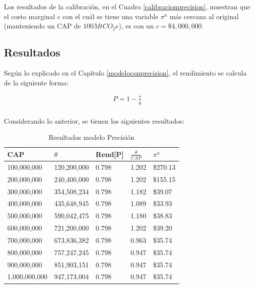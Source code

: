 Los resultados de la calibración, en el Cuadro \ref{calibracionprecision}, muestran que el costo marginal $c$ con el cuál se tiene una variable $\pi^a$ más cercana al original (manteniendo un CAP de $100MtCO_{2}e$), es con un $c=\$4,000,000$.

\subsection{Resultados}

Según lo explicado en el Capítulo \ref{modeloconprecision}, el rendimiento se calcula de la siguiente forma: 
\vspace{2.5mm}

\begin{equation}
\begin{array}{rrclcl}
\displaystyle P = 1- \frac{r}{\hat{\theta}} \\
\end{array}
\end{equation}

Considerando lo anterior, se tienen los siguientes resultados:

\begin{table}[H]
    \centering
    \begin{tabular}{|l|l|l|l|l|}
    \hline
        CAP & $\theta$ & Rend[P] & $\frac{\theta}{CAP}$  & $\pi^a$ \\ \hline
        100,000,000 & 120,200,000  & 0.798  & 1.202  &  \$270.13   \\ \hline
        200,000,000 & 240,400,000  & 0.798  & 1.202  &  \$155.15   \\ \hline
        300,000,000 & 354,508,234  & 0.798  & 1.182  &  \$39.07   \\ \hline
        400,000,000 & 435,648,945  & 0.798  & 1.089  &  \$33.93   \\ \hline
        500,000,000 & 590,042,475  & 0.798  & 1.180  &  \$38.83   \\ \hline
        600,000,000 & 721,200,000  & 0.798  & 1.202  &  \$39.20   \\ \hline
        700,000,000 & 673,836,382  & 0.798  & 0.963  &  \$35.74   \\ \hline
        800,000,000 & 757,247,245  & 0.798  & 0.947  &  \$35.74   \\ \hline
        900,000,000 & 851,903,151  & 0.798  & 0.947  &  \$35.74   \\ \hline
        1,000,000,000 & 947,173,004  & 0.798  & 0.947  &  \$35.74   \\ \hline
    \end{tabular}
    \caption{{\footnotesize Resultados modelo Precisión}}
    \label{resultadosprecision}
\end{table}

